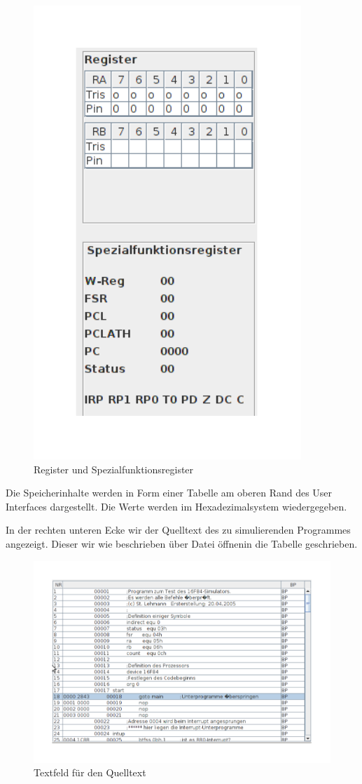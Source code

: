 \begin{figure}[h]
\centering
\includegraphics[scale=0.5]{Bilder/Register.pdf}
\caption{Register und Spezialfunktionsregister}
\end{figure}

Die Speicherinhalte werden in Form einer Tabelle am oberen Rand des User Interfaces dargestellt. Die Werte werden im Hexadezimalsystem wiedergegeben. 


\noindent In der rechten unteren Ecke wir der Quelltext des zu simulierenden Programmes angezeigt. Dieser wir wie beschrieben \"uber \glqq Datei \"offnen\grqq in die Tabelle geschrieben.

\begin{figure}[h]
\centering
\includegraphics[scale=0.5]{Bilder/Text.pdf}
\caption{Textfeld f\"ur den Quelltext}
\end{figure}